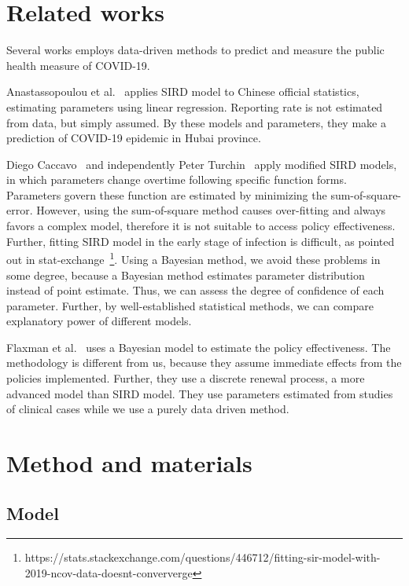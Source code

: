 \documentclass{article}
\begin{document}
\section{Related works}

Several works employs data-driven methods to predict and measure the public health measure of COVID-19.

Anastassopoulou et al.~\cite{Anastassopoulou2020} applies SIRD model to Chinese official statistics, estimating parameters using linear regression.
Reporting rate is not estimated from data, but simply assumed.
By these models and parameters, they make a prediction of COVID-19 epidemic in Hubai province.

Diego Caccavo~\cite{Caccavo2020} and independently Peter Turchin~\cite{Turchin2020} apply modified SIRD models, in which parameters change overtime following specific function forms.
Parameters govern these function are estimated by minimizing the sum-of-square-error.
However, using the sum-of-square method causes over-fitting and always favors a complex model, therefore it is not suitable to access policy effectiveness.
Further, fitting SIRD model in the early stage of infection is difficult, as pointed out in stat-exchange~\footnote{https://stats.stackexchange.com/questions/446712/fitting-sir-model-with-2019-ncov-data-doesnt-conververge}.
Using a Bayesian method, we avoid these problems in some degree, because a Bayesian method estimates parameter distribution instead of point estimate.
Thus, we can assess the degree of confidence of each parameter.
Further, by well-established statistical methods, we can compare explanatory power of different models.

Flaxman et al.~\cite{Flaxman2020} uses a Bayesian model to estimate the policy effectiveness.
The methodology is different from us, because they assume immediate effects from the policies implemented.
Further, they use a discrete renewal process, a more advanced model than SIRD model.
They use parameters estimated from studies of clinical cases while we use a purely data driven method.

\section{Method and materials}

\subsection{Model}
\end{document}
